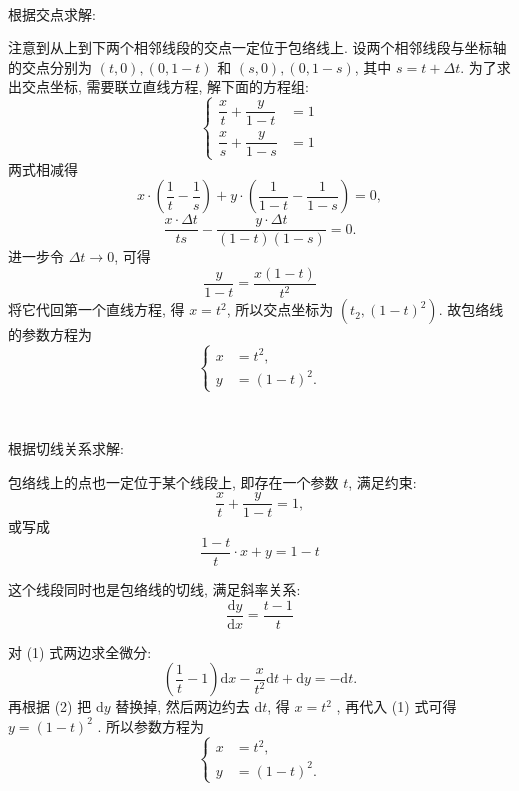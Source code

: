 ~

\noindent 根据交点求解: 

注意到从上到下两个相邻线段的交点一定位于包络线上. 设两个相邻线段与坐标轴的交点分别为 $(t,0), (0,1-t)$ 和 $(s, 0), (0, 1-s)$, 其中 $s = t+\Delta t$. 为了求出交点坐标, 需要联立直线方程, 解下面的方程组:
\[ \begin{cases}
\dfrac{x}{t} + \dfrac{y}{1-t} &= 1 \\
\dfrac{x}{s} + \dfrac{y}{1-s} &= 1
\end{cases}\]
两式相减得 
\[ x\cdot\left(\frac{1}{t} - \frac{1}{s}\right) + y\cdot \left(\frac{1}{1-t} - \frac{1}{1-s}\right) = 0,\]
\[\frac{x\cdot\Delta t}{ts} - \frac{y\cdot \Delta t}{(1-t)(1-s)} = 0 .\]
进一步令 $\Delta t \to 0$, 可得
\[ \frac{y}{1-t} = \frac{x(1-t)}{t^2} \]
将它代回第一个直线方程, 得 $x = t^2$, 所以交点坐标为 $(t_2, (1-t)^2)$. 故包络线的参数方程为
\[ \begin{cases}
x &= t^2, \\
y &= (1-t)^2 .
\end{cases}\]


~

\noindent 根据切线关系求解:
\begin{figure*}[htbp]
\centering
{}
\end{figure*}

包络线上的点也一定位于某个线段上, 即存在一个参数 $t$, 满足约束:
\[ \frac{x}{t}+\frac{y}{1-t} = 1 ,\]
或写成
\[ \frac{1-t}{t}\cdot x + y = 1-t \tag{1}\]

这个线段同时也是包络线的切线, 满足斜率关系:
\[ \frac{\mathrm{d}y}{\mathrm{d}x} = \frac{t-1}{t} \tag{2} \]

对 (1) 式两边求全微分:
\[ (\frac{1}{t}-1)\mathrm{d}x - \frac{x}{t^2}\mathrm{d}t  + \mathrm{d} y = -\mathrm{d}t .\]
再根据 (2) 把 $\mathrm{d}y$ 替换掉, 然后两边约去 $\mathrm{d}t$, 得 $ x = t^2$ , 再代入 (1) 式可得 $ y = (1-t)^2 $ .
所以参数方程为
\[ \begin{cases}
x &= t^2, \\
y &= (1-t)^2 .
\end{cases}\]

